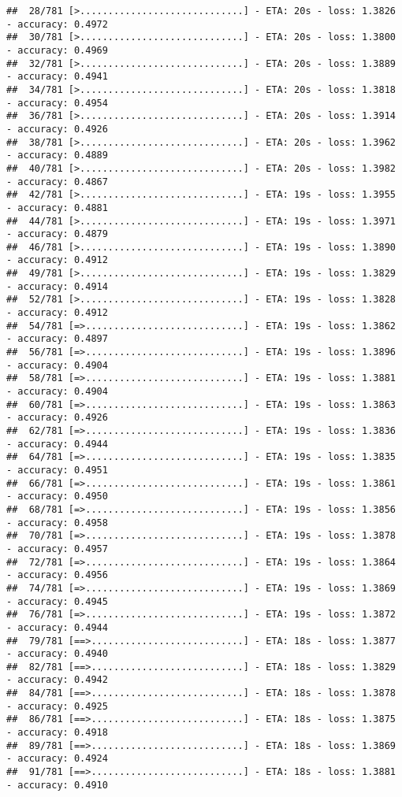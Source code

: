 \documentclass[
]{article}
\begin{document}
\begin{verbatim}
##  28/781 [>.............................] - ETA: 20s - loss: 1.3826 - accuracy: 0.4972
##  30/781 [>.............................] - ETA: 20s - loss: 1.3800 - accuracy: 0.4969
##  32/781 [>.............................] - ETA: 20s - loss: 1.3889 - accuracy: 0.4941
##  34/781 [>.............................] - ETA: 20s - loss: 1.3818 - accuracy: 0.4954
##  36/781 [>.............................] - ETA: 20s - loss: 1.3914 - accuracy: 0.4926
##  38/781 [>.............................] - ETA: 20s - loss: 1.3962 - accuracy: 0.4889
##  40/781 [>.............................] - ETA: 20s - loss: 1.3982 - accuracy: 0.4867
##  42/781 [>.............................] - ETA: 19s - loss: 1.3955 - accuracy: 0.4881
##  44/781 [>.............................] - ETA: 19s - loss: 1.3971 - accuracy: 0.4879
##  46/781 [>.............................] - ETA: 19s - loss: 1.3890 - accuracy: 0.4912
##  49/781 [>.............................] - ETA: 19s - loss: 1.3829 - accuracy: 0.4914
##  52/781 [>.............................] - ETA: 19s - loss: 1.3828 - accuracy: 0.4912
##  54/781 [=>............................] - ETA: 19s - loss: 1.3862 - accuracy: 0.4897
##  56/781 [=>............................] - ETA: 19s - loss: 1.3896 - accuracy: 0.4904
##  58/781 [=>............................] - ETA: 19s - loss: 1.3881 - accuracy: 0.4904
##  60/781 [=>............................] - ETA: 19s - loss: 1.3863 - accuracy: 0.4926
##  62/781 [=>............................] - ETA: 19s - loss: 1.3836 - accuracy: 0.4944
##  64/781 [=>............................] - ETA: 19s - loss: 1.3835 - accuracy: 0.4951
##  66/781 [=>............................] - ETA: 19s - loss: 1.3861 - accuracy: 0.4950
##  68/781 [=>............................] - ETA: 19s - loss: 1.3856 - accuracy: 0.4958
##  70/781 [=>............................] - ETA: 19s - loss: 1.3878 - accuracy: 0.4957
##  72/781 [=>............................] - ETA: 19s - loss: 1.3864 - accuracy: 0.4956
##  74/781 [=>............................] - ETA: 19s - loss: 1.3869 - accuracy: 0.4945
##  76/781 [=>............................] - ETA: 19s - loss: 1.3872 - accuracy: 0.4944
##  79/781 [==>...........................] - ETA: 18s - loss: 1.3877 - accuracy: 0.4940
##  82/781 [==>...........................] - ETA: 18s - loss: 1.3829 - accuracy: 0.4942
##  84/781 [==>...........................] - ETA: 18s - loss: 1.3878 - accuracy: 0.4925
##  86/781 [==>...........................] - ETA: 18s - loss: 1.3875 - accuracy: 0.4918
##  89/781 [==>...........................] - ETA: 18s - loss: 1.3869 - accuracy: 0.4924
##  91/781 [==>...........................] - ETA: 18s - loss: 1.3881 - accuracy: 0.4910

\end{verbatim}
\end{document}
